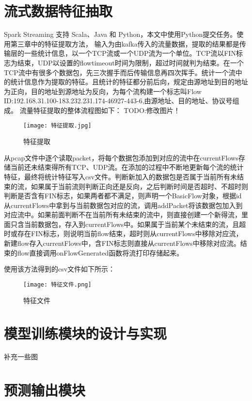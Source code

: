 \section{流式数据特征抽取}
Spark Streaming 支持 Scala、Java 和 Python，本文中使用Python提交任务。使用第三章中的特征提取方法，
输入为由kafka传入的流量数据，提取的结果都是传输层的一些统计信息，以一个TCP流或一个UDP流为一个单位。TCP流以FIN标志为结束，UDP以设置的flowtimeout时间为限制，超过时间就判为结束。在一个TCP流中有很多个数据包，先三次握手而后传输信息再四次挥手。统计一个流中的统计信息作为提取的特征。且统计的特征都分前后向，规定由源地址到目的地址为正向，目的地址到源地址为反向，为每个流构建一个标志叫Flow ID:192.168.31.100-183.232.231.174-46927-443-6,由源地址、目的地址、协议号组成。
流量特征提取的整体流程图如下：
TODO:修改图片！
\begin{figure}
    \centering
    \texttt{[image: 特征提取.jpg]}
    \caption{特征提取}
    \label{fig:特征提取}
  \end{figure}

从pcap文件中逐个读取packet，将每个数据包添加到对应的流中在currentFlows存储当前还未结束得所有TCP、UDP流。在添加的过程中不断地更新每个流的统计特征，最终将统计特征写入csv文件。判断新加入的数据包是否属于当前所有未结束的流，如果属于当前流则判断正向还是反向，之后判断时间是否超时、不超时则判断是否含有FIN标志，如果两者都不满足，则声明一个BasicFlow对象，根据id从currentFlows中拿到与当前数据包对应的流，调用addPacket将该数据包加入到对应流中。如果前面判断不在当前所有未结束的流中，则直接创建一个新得流，里面只含当前数据包，存入到currentFlows中。如果属于当前某个未结束的流，且超时或存在FIN标志，则说明当前flow结束，超时则从currentFlows中移除对应流，新建flow存入currentFlows中，含FIN标志则直接从currentFlows中移除对应流。结束的flow直接调用onFlowGenerated函数将流打印存储起来。

使用该方法得到的csv文件如下所示：
\begin{figure}
    \centering
    \texttt{[image: 特征文件.png]}
    \caption{特征文件}
    \label{fig:特征文件}
  \end{figure}


\section{模型训练模块的设计与实现}
补充一些图
\section{预测输出模块}
